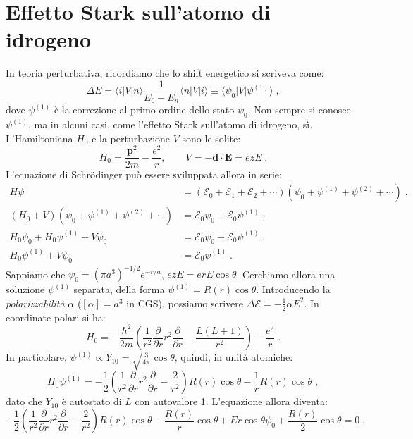 \documentclass[12pt,a4paper]{report}
\theoremstyle{definition}
\numberwithin{equation}{section}
\newcommand{\bra}{\langle}
\newcommand{\ket}{\rangle}
\newcommand{\Sch}{Schrödinger}
\begin{document}
\section{Effetto Stark sull'atomo di idrogeno}
In teoria perturbativa, ricordiamo che lo shift energetico si scriveva come:
$$
\Delta E=\bra i|V|n\ket\frac{1}{E_0-E_n}\bra n|V|i\ket\equiv \bra \psi_0|V|\psi^{(1)}\ket\;,
$$
dove $\psi^{(1)}$ è la correzione al primo ordine dello stato $\psi_0$. Non sempre si conosce $\psi^{(1)}$, ma in alcuni casi, come l'effetto Stark sull'atomo di idrogeno, sì. L'Hamiltoniana $H_0$ e la perturbazione $V$ sono le solite:
\begin{equation}
H_0=\frac{\mathbf{p}^2}{2m}-\frac{e^2}{r},\qquad V=-\mathbf{d}\cdot\mathbf{E}=ezE\;.
\end{equation}
L'equazione di \Sch\; può essere sviluppata allora in serie:
\begin{align*}
H\psi &= (\mathcal{E}_0+\mathcal{E}_1+\mathcal{E}_2+\cdots)(\psi_0+\psi^{(1)}+\psi^{(2)}+\cdots)\;, \\
(H_0+V)(\psi_0+\psi^{(1)}+\psi^{(2)}+\cdots)&=\mathcal{E}_0\psi_0+\mathcal{E}_0\psi^{(1)}\;, \\
H_0\psi_0+H_0\psi^{(1)}+V\psi_0 &= \mathcal{E}_0\psi_0+\mathcal{E}_0\psi^{(1)}\;, \\
H_0\psi^{(1)}+V\psi_0 &= \mathcal{E}_0\psi^{(1)}\;.
\end{align*}
Sappiamo che $\psi_0=(\pi a^3)^{-1/2}e^{-r/a}$, $ezE=erE\cos\theta$. Cerchiamo allora una soluzione $\psi^{(1)}$ separata, della forma $\psi^{(1)}=R(r)\cos\theta$. Introducendo la \textit{polarizzabilità} $\alpha$ ($[\alpha]=a^3$ in CGS), possiamo scrivere $\Delta\mathcal{E}=-\frac{1}{2}\alpha E^2$. In coordinate polari si ha:
\begin{equation}
H_0=-\frac{\hbar^2}{2m}\left(\frac{1}{r^2}\frac{\partial}{\partial r}r^2\frac{\partial}{\partial r}-\frac{L(L+1)}{r^2}\right)-\frac{e^2}{r}\;.
\end{equation}
In particolare, $\psi^{(1)}\propto Y_{10}=\sqrt{\frac{3}{4\pi}}\cos\theta$, quindi, in unità atomiche:
\begin{equation}
H_0\psi^{(1)}=-\frac{1}{2}\left(\frac{1}{r^2}\frac{\partial}{\partial r}r^2\frac{\partial}{\partial r}-\frac{2}{r^2}\right)R(r)\cos\theta-\frac{1}{r}R(r)\cos\theta\;,
\end{equation}
dato che $Y_{10}$ è autostato di $L$ con autovalore 1. L'equazione allora diventa:
\begin{equation}
-\frac{1}{2}\left(\frac{1}{r^2}\frac{\partial}{\partial r}r^2\frac{\partial}{\partial r}-\frac{2}{r^2}\right)R(r)\cos\theta-\frac{R(r)}{r}\cos\theta+Er\cos\theta\psi_0+\frac{R(r)}{2}\cos\theta=0\;.
\end{equation}
\end{document}
